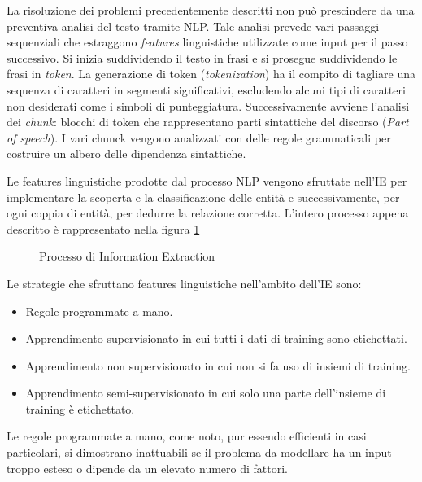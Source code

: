 La risoluzione dei problemi precedentemente descritti non può prescindere da una preventiva analisi del testo tramite NLP. Tale analisi prevede vari passaggi sequenziali che estraggono \textit{features} linguistiche utilizzate come input per il passo successivo. Si inizia suddividendo il testo in frasi e si prosegue suddividendo le frasi in \textit{token}. La generazione di token (\textit{tokenization}) ha il compito di tagliare una sequenza di caratteri in segmenti significativi, escludendo alcuni tipi di caratteri non desiderati come i simboli di punteggiatura. Successivamente avviene l'analisi dei \textit{chunk}: blocchi di token che rappresentano parti sintattiche del discorso (\textit{Part of speech}). I vari chunck vengono analizzati con delle regole grammaticali per costruire un albero delle dipendenza sintattiche.

Le features linguistiche prodotte dal processo NLP vengono sfruttate nell'IE per implementare la scoperta e la classificazione delle entità e successivamente, per ogni coppia di entità, per dedurre la relazione corretta. L'intero processo appena descritto è rappresentato nella figura \ref{fig:literature_review:ie} 

\begin{figure}[htb]
	\caption{Processo di Information Extraction}
\label{fig:literature_review:ie}
\end{figure}

Le strategie che sfruttano features linguistiche nell'ambito dell'IE sono:
\begin{itemize}
\item Regole programmate a mano.
\item Apprendimento supervisionato in cui tutti i dati di training sono etichettati.
\item Apprendimento non supervisionato in cui non si fa uso di insiemi di training.
\item Apprendimento semi-supervisionato in cui solo una parte dell'insieme di training è etichettato.
\end{itemize}
Le regole programmate a mano, come noto, pur essendo efficienti in casi particolari, si dimostrano inattuabili se il problema da modellare ha un input troppo esteso o dipende da un elevato numero di fattori.


